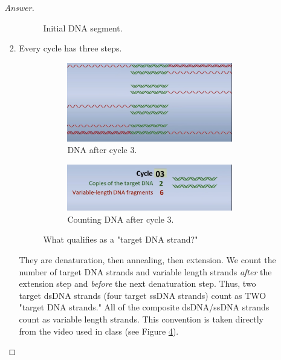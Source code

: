 \documentclass[../psets.tex]{subfiles}
\begin{document}
\begin{enumerate}
\begin{enumerate}
\begin{proof}[Answer]
\begin{enumerate}
\begin{figure}[h!]
                    \caption{Initial DNA segment.}
                    \label{fig:DNAinit}
                \end{figure}
                \item Every cycle has three steps.
                \begin{figure}[H]
                    \centering
                    \begin{subfigure}[b]{0.4\linewidth}
                        \centering
                        \includegraphics[width=0.9\linewidth]{../ExtFiles/pset3-targetDNAa.png}
                        \caption{DNA after cycle 3.}
                        \label{fig:pset3-targetDNAa}
                    \end{subfigure}
                    \begin{subfigure}[b]{0.4\linewidth}
                        \centering
                        \includegraphics[width=0.9\linewidth]{../ExtFiles/pset3-targetDNAb.png}
                        \caption{Counting DNA after cycle 3.}
                        \label{fig:pset3-targetDNAb}
                    \end{subfigure}
                    \caption{What qualifies as a "target DNA strand?"}
                    \label{fig:targetDNA}
                \end{figure}
                They are denaturation, then annealing, then extension. We count the number of target DNA strands and variable length strands \emph{after} the extension step and \emph{before} the next denaturation step. Thus, two target dsDNA strands (four target ssDNA strands) count as TWO "target DNA strands." All of the composite dsDNA/ssDNA strands count as variable length strands. This convention is taken directly from the video used in class (see Figure \ref{fig:targetDNA}).

\end{enumerate}
\end{proof}
\end{enumerate}
\end{enumerate}
\end{document}
